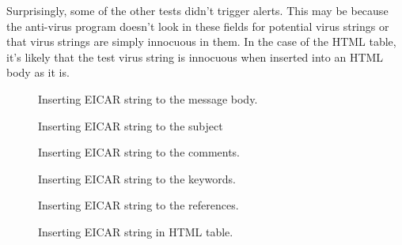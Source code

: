 \documentclass[10pt,conference]{IEEEtran}
\begin{document}
Surprisingly, some of the other tests didn't trigger alerts. This may be because
the anti-virus program doesn't look in these fields for potential virus strings or that virus strings are simply innocuous in them.
In the case of the HTML table, it's likely that the test virus string is innocuous when inserted into an HTML body as it is.

\begin{figure}
\begin{mdframed}

\caption{Inserting EICAR string to the message body.}
\label{fig:body}
\end{mdframed}
\end{figure}

\begin{figure}
\begin{mdframed}

\caption{Inserting EICAR string to the subject}
\label{fig:subject}
\end{mdframed}
\end{figure}

\begin{figure}
\begin{mdframed}

\caption{Inserting EICAR string to the comments.}
\label{fig:comments}
\end{mdframed}
\end{figure}

\begin{figure}
\begin{mdframed}

\caption{Inserting EICAR string to the keywords.}
\label{fig:keywords}
\end{mdframed}
\end{figure}

\begin{figure}
\begin{mdframed}

\caption{Inserting EICAR string to the references.}
\label{fig:references}
\end{mdframed}
\end{figure}

\begin{figure}
\begin{mdframed}

\caption{Inserting EICAR string in HTML table.}
\label{fig:html}
\end{mdframed}
\end{figure}
\end{document}
